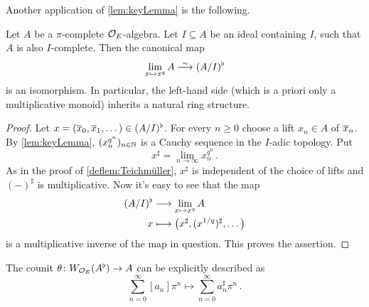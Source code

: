 Another application of \cref{lem:keyLemma} is the following.
\begin{prop}\label{prop:(A/I)b}
	Let $A$ be a $\pi$-complete $\mathcal{O}_E$-algebra. Let $I\subseteq A$ be an ideal containing $I$, such that $A$ is also $I$-complete. Then the canonical map
	\begin{equation*}
		\limit_{x\mapsto x^q}A\isomorphism (A/I)^\flat
	\end{equation*}
	is an isomorphism. In particular, the left-hand side (which is a priori only a multiplicative monoid) inherits a natural ring structure.
\end{prop}
\begin{proof}
	Let $x=(\ov{x}_0,\ov{x}_1,\dotsc)\in (A/I)^\flat$. For every $n\geq 0$ choose a lift $x_n\in A$ of $\ov{x}_n$. By \cref{lem:keyLemma}, $(x_n^{q^n})_{n\in\mathbb{N}}$ is a Cauchy sequence in the $I$-adic topology. Put
	\begin{equation*}
		x^\sharp=\lim_{n\to\infty}x_n^{q^n}\,.
	\end{equation*}
	As in the proof of \cref{deflem:Teichmüller}, $x^\sharp$ is independent of the choice of lifts and $(-)^\sharp$ is multiplicative. Now it's easy to see that the map
	\begin{align*}
		(A/I)^\flat&\morphism \limit_{x\mapsto x^q}A\\
		x&\longmapsto \big(x^\sharp,(x^{1/q})^\sharp,\dotsc\big)
	\end{align*}
	is a multiplicative inverse of the map in question. This proves the assertion.
\end{proof}
\begin{lem}\label{lem:WAb->A}
	The counit $\theta\colon W_{\Oo_E}(A^\flat)\morphism A$ can be explicitly described as 
	\begin{equation*}
		\sum_{n=0}^\infty[a_n]\pi^n\longmapsto \sum_{n=0}^\infty a_n^\sharp \pi^n\,.
	\end{equation*}
\end{lem}
